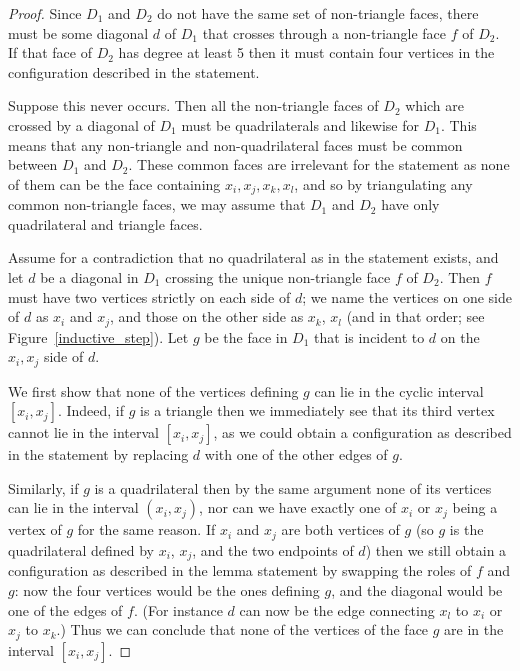 \documentclass[11pt]{article}
\theoremstyle{remark}
\theoremstyle{definition}
\begin{document}
\begin{proof}
  Since $D_1$ and $D_2$ do not have the same set of non-triangle faces, there must be some diagonal $d$ of $D_1$ that crosses through a non-triangle face $f$ of $D_2$.  If that face of $D_2$ has degree at least 5 then it must contain four vertices in the configuration described in the statement.

Suppose this never occurs.  Then all the non-triangle faces of $D_2$ which are crossed by a diagonal of $D_1$ must be quadrilaterals and likewise for $D_1$.  This means that any non-triangle and non-quadrilateral faces must be common between $D_1$ and $D_2$.  These common faces are irrelevant for the statement as none of them can be the face containing $x_i, x_j, x_k, x_l$, and so by triangulating any common non-triangle faces, we may assume that $D_1$ and $D_2$ have only quadrilateral and triangle faces.

Assume for a contradiction that no quadrilateral as in the statement exists, and let $d$ be a diagonal in $D_1$ crossing the unique non-triangle face $f$ of $D_2$. Then $f$ must have two vertices strictly on each side of $d$; we name the vertices on one side of $d$ as $x_i$ and $x_j$, and those on the other side as $x_k$, $x_l$ (and in that order; see Figure~\ref{inductive_step}).  Let $g$ be the face in $D_1$ that is incident to $d$ on the $x_i, x_j$ side of $d$.

We first show that none of the vertices defining $g$ can lie in the cyclic interval $[x_i,x_j]$. Indeed, if $g$ is a triangle then we immediately see that its third vertex cannot lie in the interval $[x_i,x_j]$, as we could obtain a configuration as described in the statement by replacing $d$ with one of the other edges of $g$.

Similarly, if $g$ is a quadrilateral then by the same argument none of its vertices can lie in the interval $(x_i, x_j)$, nor can we have exactly one of $x_i$ or $x_j$ being a vertex of $g$ for the same reason. If $x_i$ and $x_j$ are both vertices of $g$ (so $g$ is the quadrilateral defined by $x_i$, $x_j$, and the two endpoints of $d$) then we still obtain a configuration as described in the lemma statement by swapping the roles of $f$ and $g$: now the four vertices would be the ones defining $g$, and the diagonal would be one of the edges of $f$. (For instance $d$ can now be the edge connecting $x_l$ to $x_i$ or $x_j$ to $x_k$.) Thus we can conclude that none of the vertices of the face $g$ are in the interval $[x_i, x_j]$.  


\end{proof}
\end{document}

